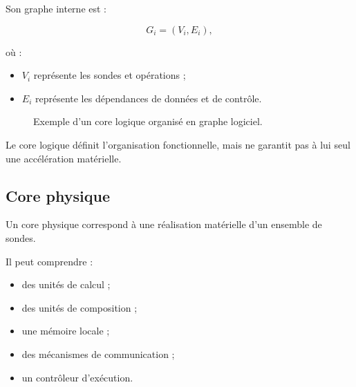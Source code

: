 \documentclass[11pt,a4paper]{article}
\begin{document}
Son graphe interne est :

\[
G_i=(V_i,E_i),
\]

où :
\begin{itemize}
  \item $V_i$ représente les sondes et opérations ;
  \item $E_i$ représente les dépendances de données et de contrôle.
\end{itemize}

\begin{figure}[H]
\centering
{}
\caption{Exemple d'un core logique organisé en graphe logiciel.}
\end{figure}

Le core logique définit l'organisation fonctionnelle, mais ne garantit
pas à lui seul une accélération matérielle.

\subsection{Core physique}

Un core physique correspond à une réalisation matérielle d'un ensemble
de sondes.

Il peut comprendre :
\begin{itemize}
  \item des unités de calcul ;
  \item des unités de composition ;
  \item une mémoire locale ;
  \item des mécanismes de communication ;
  \item un contrôleur d'exécution.
\end{itemize}
\end{document}
